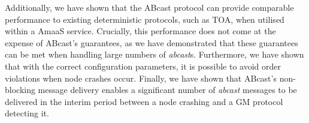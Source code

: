 Additionally, we have shown that the \textsf{ABcast} protocol can provide comparable performance to existing deterministic protocols, such as TOA, when utilised within a \textsf{AmaaS} service.  Crucially, this performance does not come at the expense of \textsf{ABcast}'s guarantees, as we have demonstrated that these guarantees can be met when handling large numbers of \emph{abcast}s.  Furthermore, we have shown that with the correct configuration parameters, it is possible to avoid order violations when node crashes occur.  Finally, we have shown that \textsf{ABcast}'s non-blocking message delivery enables a significant number of \emph{abcast} messages to be delivered in the interim period between a node crashing and a GM protocol detecting it.  